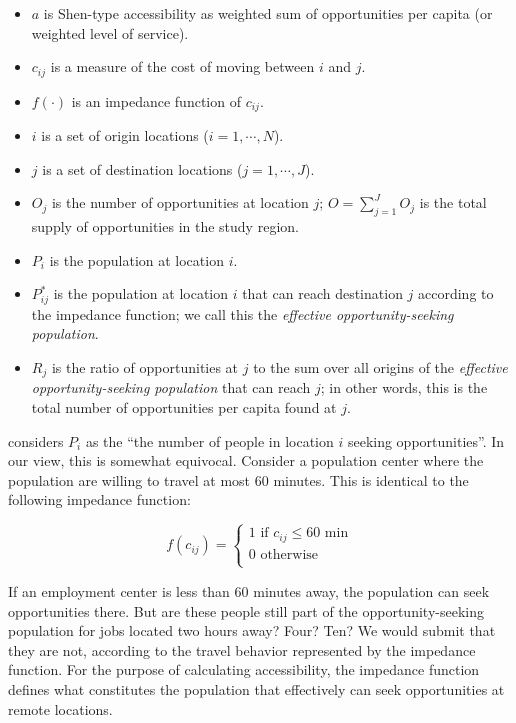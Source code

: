 \documentclass[]{elsarticle} %
\providecommand{\tightlist}{%
  \setlength{\itemsep}{0pt}\setlength{\parskip}{0pt}}
\begin{document}
\begin{itemize}
\tightlist
\item
  \(a\) is Shen-type accessibility as weighted sum of opportunities per
  capita (or weighted level of service).
\item
  \(c_{ij}\) is a measure of the cost of moving between \(i\) and \(j\).
\item
  \(f(\cdot)\) is an impedance function of \(c_{ij}\).
\item
  \(i\) is a set of origin locations (\(i = 1,\cdots,N\)).
\item
  \(j\) is a set of destination locations (\(j = 1,\cdots,J\)).
\item
  \(O_j\) is the number of opportunities at location \(j\);
  \(O = \sum_{j=1}^J O_j\) is the total supply of opportunities in the
  study region.
\item
  \(P_i\) is the population at location \(i\).
\item
  \(P_{ij}^*\) is the population at location \(i\) that can reach
  destination \(j\) according to the impedance function; we call this
  the \emph{effective opportunity-seeking population}.
\item
  \(R_j\) is the ratio of opportunities at \(j\) to the sum over all
  origins of the \emph{effective opportunity-seeking population} that
  can reach \(j\); in other words, this is the total number of
  opportunities per capita found at \(j\).
\end{itemize}

\citet{shen1998} considers \(P_i\) as the ``the number of people in
location \(i\) seeking opportunities''. In our view, this is somewhat
equivocal. Consider a population center where the population are willing
to travel at most 60 minutes. This is identical to the following
impedance function:

\begin{equation}
\label{eq:binary-impedance}
f(c_{ij}) =
\begin{cases}
1\text{ if }c_{ij}\leq60\text{ min}\\
0\text{ otherwise}\\
\end{cases}
\end{equation}

If an employment center is less than 60 minutes away, the population can
seek opportunities there. But are these people still part of the
opportunity-seeking population for jobs located two hours away? Four?
Ten? We would submit that they are not, according to the travel behavior
represented by the impedance function. For the purpose of calculating
accessibility, the impedance function defines what constitutes the
population that effectively can seek opportunities at remote locations.
\end{document}
